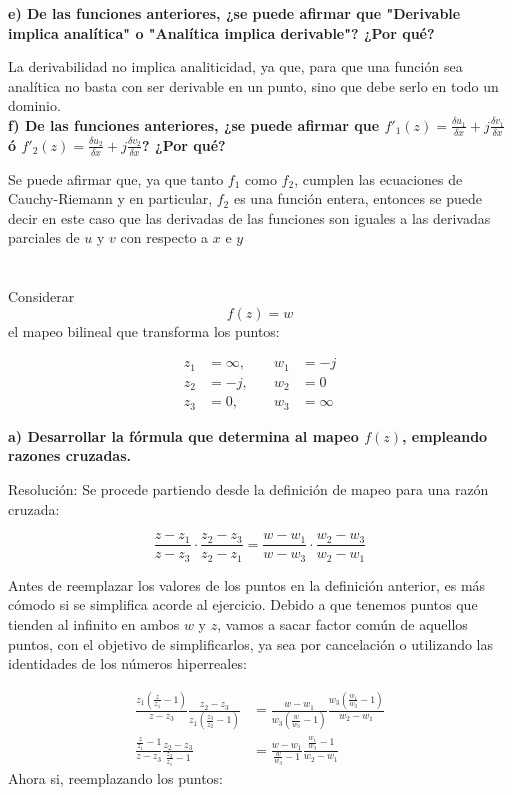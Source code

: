 \documentclass[12pt,a4paper]{report}
\begin{document}
\textbf{e) De las funciones anteriores, ¿se puede afirmar que "Derivable implica analítica" o "Analítica implica derivable"? ¿Por qué?}

La derivabilidad no implica analiticidad, ya que, para que una función sea analítica no basta con ser derivable en un punto, sino  que debe serlo en todo un dominio.\\

\textbf{f) De las funciones anteriores, ¿se puede afirmar que $f'_1(z)=\frac{\delta u_1}{\delta x}+j\frac{\delta v_1}{\delta x}$ \quad ó \quad 
$f'_2(z)=\frac{\delta u_2}{\delta x}+j\frac{\delta v_2}{\delta x}$? ¿Por qué?}

Se puede afirmar que, ya que tanto $f_1$ como $f_2$, cumplen las ecuaciones de Cauchy-Riemann y en particular, $f_2$ es una función entera, entonces se puede decir en este caso que 
las derivadas de las funciones son iguales a las derivadas parciales de $u$ y $v$ con respecto a $x$ e $y$

\chapter{}%

Considerar $$ f(z) = w $$ el mapeo bilineal que transforma los puntos:

\begin{align*}
    z_1 &= \infty, \quad & w_1 &= -j \\
    z_2 &= -j, \quad & w_2 &= 0 \\
    z_3 &= 0, \quad & w_3 &= \infty 
\end{align*}

\textbf{a) Desarrollar la fórmula que determina al mapeo \( f(z) \), empleando razones cruzadas.}

Resolución: Se procede partiendo desde la definición de mapeo para una razón cruzada:

$$ \frac{z - z_1}{z - z_3} \cdot \frac{z_2 - z_3}{z_2 - z_1} = \frac{w - w_1}{w - w_3} \cdot \frac{w_2 - w_3}{w_2 - w_1} $$

Antes de reemplazar los valores de los puntos en la definición anterior, es más cómodo si se simplifica acorde al ejercicio. Debido a que tenemos puntos que tienden al infinito en ambos \( w \) y \( z \), vamos a sacar factor común de aquellos puntos, con el objetivo de simplificarlos, ya sea por cancelación o utilizando las identidades de los números hiperreales:

\begin{align*}
    \frac{z_1 \left(\frac{z}{z_1}-1\right) }{z-z_3} \frac{z_2-z_3}{z_1 \left( \frac{z_3}{z_2} -1 \right) } &= \frac{w-w_1}{w_3 \left( \frac{w}{w_3} - 1 \right)} \frac{w_3 \left( \frac{w_1}{w_3} -1 \right) }{w_2-w_1}\\[10pt]
    \frac{\frac{z}{z_1} -1}{z-z_3} \frac{z_2-z_3}{\frac{z_3}{z_1}-1} &= \frac{w-w_1}{\frac{w}{w_3}-1} \frac{\frac{w_1}{w_3}-1}{w_2-w_1}
\end{align*}
Ahora si, reemplazando los puntos:
\end{document}
